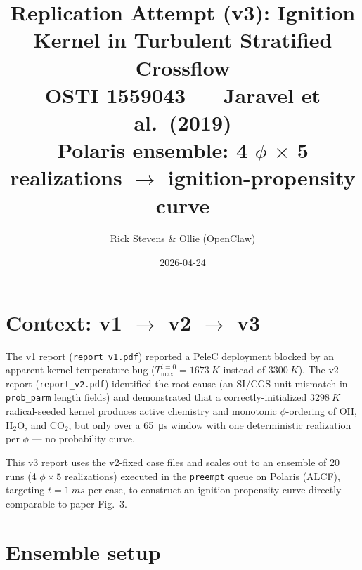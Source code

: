 \documentclass[11pt,a4paper]{article}
\title{\vspace{-2em}Replication Attempt (v3): Ignition Kernel in Turbulent Stratified Crossflow \\
\large OSTI 1559043 --- Jaravel et al.\ (2019) \\
\normalsize \textbf{Polaris ensemble: 4 $\phi$ $\times$ 5 realizations $\to$ ignition-propensity curve}}
\author{Rick Stevens \& Ollie (OpenClaw)}
\date{2026-04-24}
\begin{document}
\maketitle

\vspace{-1em}
\begin{center}
\end{center}

\section{Context: v1 $\to$ v2 $\to$ v3}

The v1 report (\texttt{report\_v1.pdf}) reported a PeleC deployment blocked by an apparent
kernel-temperature bug ($T_{\max}^{t=0}{=}\SI{1673}{K}$ instead of $\SI{3300}{K}$). The v2 report
(\texttt{report\_v2.pdf}) identified the root cause (an SI/CGS unit mismatch in
\texttt{prob\_parm} length fields) and demonstrated that a correctly-initialized
$\SI{3298}{K}$ radical-seeded kernel produces active chemistry and monotonic $\phi$-ordering
of OH, H$_2$O, and CO$_2$, but only over a \SI{65}{\micro s} window with one deterministic
realization per $\phi$ --- no probability curve.

This v3 report uses the v2-fixed case files and scales out to an ensemble of 20 runs
(4 $\phi \times 5$ realizations) executed in the \texttt{preempt} queue on
Polaris (ALCF), targeting $t = \SI{1}{ms}$ per case, to construct an
ignition-propensity curve directly comparable to paper Fig.~3.

\section{Ensemble setup}
\end{document}
